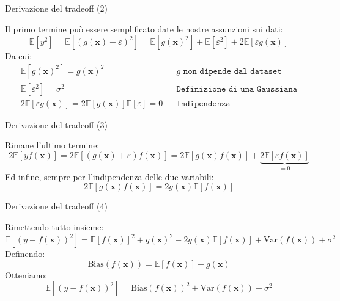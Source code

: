 \documentclass[12pt,aspectratio=169]{beamer}
\begin{document}
\begin{frame}{Derivazione del tradeoff (2)}

	Il primo termine può essere semplificato date le nostre assunzioni sui dati:
	\begin{equation}
		\mathbb{E}[y^2] = \mathbb{E}[(g(\mathbf{x}) + \varepsilon)^2] = \mathbb{E}[g(\mathbf{x})^2] + \mathbb{E}[\varepsilon^2] + 2\mathbb{E}[\varepsilon g(\mathbf{x})]
	\end{equation}
	Da cui:
	\begin{align}
		\mathbb{E}[g(\mathbf{x})^2] = g(\mathbf{x})^2                                                  &  & \texttt{$g$ non dipende dal dataset}  \\
		\mathbb{E}[\varepsilon^2] = \sigma^2                                                           &  & \texttt{Definizione di una Gaussiana} \\
		2\mathbb{E}[\varepsilon g(\mathbf{x})] = 2\mathbb{E}[g(\mathbf{x})]\mathbb{E}[\varepsilon] = 0 &  & \texttt{Indipendenza}
	\end{align}

\end{frame}

\begin{frame}{Derivazione del tradeoff (3)}

	Rimane l'ultimo termine:
	\begin{equation}
		2\mathbb{E}[yf(\mathbf{x})] = 2\mathbb{E}[(g(\mathbf{x}) + \varepsilon)f(\mathbf{x})] = 2\mathbb{E}[g(\mathbf{x})f(\mathbf{x})] + \underbrace{2\mathbb{E}[\varepsilon f(\mathbf{x})]}_{=0}
	\end{equation}
	Ed infine, sempre per l'indipendenza delle due variabili:
	\begin{equation}
		2\mathbb{E}[g(\mathbf{x})f(\mathbf{x})] = 2g(\mathbf{x})\mathbb{E}[f(\mathbf{x})]
	\end{equation}

\end{frame}

\begin{frame}{Derivazione del tradeoff (4)}

	Rimettendo tutto insieme:
	\begin{equation}
		\mathbb{E}[(y-f(\mathbf{x}))^2] = \mathbb{E}[f(\mathbf{x})]^2 + g(\mathbf{x})^2 - 2g(\mathbf{x})\mathbb{E}[f(\mathbf{x})] + \text{Var}(f(\mathbf{x})) + \sigma^2
	\end{equation}
	Definendo:
	\begin{equation}
		\text{Bias}(f(\mathbf{x})) = \mathbb{E}[f(\mathbf{x})] - g(\mathbf{x})
	\end{equation}
	Otteniamo:
	\begin{equation}
		\mathbb{E}[(y-f(\mathbf{x}))^2] = \text{Bias}(f(\mathbf{x}))^2 + \text{Var}(f(\mathbf{x})) + \sigma^2
	\end{equation}

\end{frame}
\end{document}
